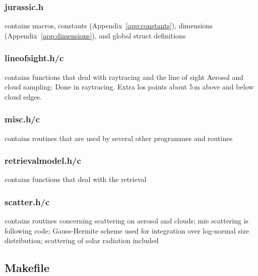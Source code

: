 \subsubsection{jurassic.h}
contains macros, constants (Appendix~\ref{app:constants}), dimensions (Appendix~\ref{app:dimensions}), and global struct definitions

\subsubsection{lineofsight.h/c}
\label{sec:lineofsight}
contains functions that deal with raytracing and the line of sight
Aerosol and cloud sampling: Done in raytracing. Extra los points about 5\,m above and below cloud edges.

\subsubsection{misc.h/c}
contains routines that are used by several other programmes and routines

\subsubsection{retrievalmodel.h/c}
contains functions that deal with the retrieval

\subsubsection{scatter.h/c}
contains routines concerning scattering on aerosol and clouds; mie scattering is following \citet{Bohren1983} code; Gauss-Hermite scheme used for integration over log-normal size distribution; scattering of solar radiation included

\subsection{Makefile}